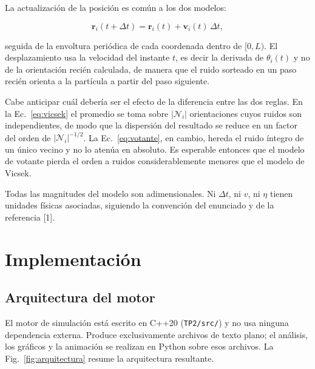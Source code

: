 \documentclass[11pt]{article}
\newcommand{\vect}[1]{\mathbf{#1}}
\begin{document}
La actualización de la posición es común a los dos modelos:

\begin{equation}
  \vect{r}_i(t+\Delta t) = \vect{r}_i(t) + \vect{v}_i(t)\,\Delta t ,
  \label{eq:posicion}
\end{equation}

seguida de la envoltura periódica de cada coordenada dentro de $[0, L)$. El
desplazamiento usa la velocidad del instante $t$, es decir la derivada de
$\theta_i(t)$ y no de la orientación recién calculada, de manera que el ruido
sorteado en un paso recién orienta a la partícula a partir del paso siguiente.

Cabe anticipar cuál debería ser el efecto de la diferencia entre las dos
reglas. En la Ec.~\eqref{eq:vicsek} el promedio se toma sobre $|\mathcal{N}_i|$
orientaciones cuyos ruidos son independientes, de modo que la dispersión del
resultado se reduce en un factor del orden de $|\mathcal{N}_i|^{-1/2}$. La
Ec.~\eqref{eq:votante}, en cambio, hereda el ruido íntegro de un único vecino y
no lo atenúa en absoluto. Es esperable entonces que el modelo de votante pierda
el orden a ruidos considerablemente menores que el modelo de Vicsek.

Todas las magnitudes del modelo son adimensionales. Ni $\Delta t$, ni $v$, ni
$\eta$ tienen unidades físicas asociadas, siguiendo la convención del enunciado
y de la referencia [1].

\section{Implementación}
\label{sec:implementacion}

\subsection{Arquitectura del motor}
\label{sec:arquitectura}

El motor de simulación está escrito en C++20 (\texttt{TP2/src/}) y no usa
ninguna dependencia externa. Produce exclusivamente archivos de texto plano; el
análisis, los gráficos y la animación se realizan en Python sobre esos
archivos. La Fig.~\ref{fig:arquitectura} resume la arquitectura resultante.
\end{document}
